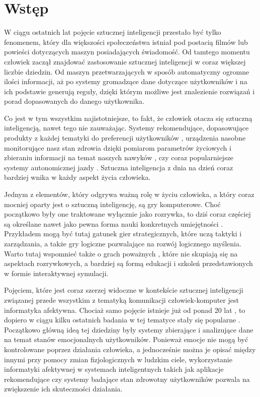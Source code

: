 \chapter{Wstęp}
\label{cha:wstep}
W ciągu ostatnich lat pojęcie sztucznej inteligencji przestało być tylko fenomenem, który dla większości społeczeństwa istniał pod postacią filmów lub powieści dotyczących maszyn posiadających świadomość. Od tamtego momentu człowiek zaczął znajdować zastosowanie sztucznej inteligencji w coraz większej liczbie dziedzin. Od maszyn przetwarzających w sposób automatyczny ogromne ilości informacji, aż po systemy gromadzące dane dotyczące użytkowników i na ich podstawie generują reguły, dzięki którym możliwe jest znalezienie rozwiązań i porad dopasowanych do danego użytkownika.

Co jest w tym wszystkim najistotniejsze, to fakt, że człowiek otacza się sztuczną inteligencją, nawet tego nie zauważając. Systemy rekomendujące, dopasowujące produkty z każdej tematyki do preferencji użytkowników \cite{Gomez-Uribe:2015:NRS:2869770.2843948}, urządzenia nasobne monitorujące nasz stan zdrowia dzięki pomiarom parametrów życiowych i zbieraniu informacji na temat naszych nawyków \cite{wearable_computing_amft}, czy coraz popularniejsze systemy autonomicznej jazdy \cite{dikmen_tesla_autopilot}. Sztuczna inteligencja z dnia na dzień coraz bardziej wnika w każdy aspekt życia człowieka. 

Jednym z elementów, który odgrywa ważną rolę w życiu człowieka, a który coraz mocniej oparty jest o sztuczną inteligencję, są gry komputerowe.  Choć początkowo były one traktowane wyłącznie jako rozrywka, to dziś coraz częściej są określane nawet jako pewna forma nauki konkretnych umiejętności \cite{oberdorfer_develop_your_strengths_by_gaming}. Przykładem mogą być tutaj gatunek gier strategicznych, które uczą taktyki i zarządzania, a także gry logiczne pozwalające na rozwój logicznego myślenia. Warto tutaj wspomnieć także o grach poważnych \cite{serious_games_michael_chen}, które nie skupiają się na aspektach rozrywkowych, a bardziej są formą edukacji i szkoleń przedstawionych w formie interaktywnej symulacji.

Pojęciem, które jest coraz szerzej widoczne w kontekście sztucznej inteligencji związanej przede wszystkim z tematyką komunikacji człowiek-komputer jest informatyka afektywna. Chociaż samo pojęcie istnieje już od ponad 20 lat \cite{Picard:1997:AC:265013}, to dopiero w ciągu kilku ostatnich badania w tej tematyce stały się popularne \cite{gartner_hype_cycles_2018}. Początkowo główną ideą tej dziedziny były systemy zbierające i analizujące dane na temat stanów emocjonalnych użytkowników. Ponieważ emocje nie mogą być kontrolowane poprzez działania człowieka, a jednocześnie można je opisać między innymi przy pomocy zmian fizjologicznych w ludzkim ciele, wykorzystanie informatyki afektywnej w systemach inteligentnych takich jak aplikacje rekomendujące czy systemy badające stan zdrowotny użytkowników pozwala na zwiększenie ich skuteczności działania.


